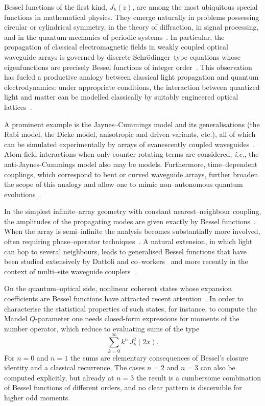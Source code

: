 \documentclass[10pt]{NSP1}
\begin{document}
Bessel functions of the first kind, $J_k(z)$, are among the most ubiquitous special functions 
in mathematical physics.  They emerge naturally in problems possessing circular or cylindrical 
symmetry, in the theory of diffraction, in signal processing, and in the quantum mechanics of 
periodic systems~\cite{Watson,Gradshteyn,NIST,Axioms}.  In particular, the propagation of classical 
electromagnetic fields in weakly coupled optical waveguide arrays is governed by discrete 
Schr\"{o}dinger--type equations whose eigenfunctions are precisely Bessel functions of 
integer order~\cite{Jones,Makris}.  This observation has fueled a productive analogy between 
classical light propagation and quantum electrodynamics: under appropriate conditions, the 
interaction between quantized light and matter can be modelled classically by suitably 
engineered optical lattices~\cite{LonghiI,LonghiII,CrispI,CrispII,ScriptaT}.

A prominent example is the Jaynes--Cummings model \cite{Several,Book} and its generalisations 
(the Rabi model, the Dicke model, anisotropic and driven variants, etc.), all of which can be 
simulated experimentally by arrays of evanescently coupled waveguides~\cite{Jaynes,Shore,Larson,Chen,BraakI,Anisotropic,Bocanegra,Vidiella,Dicke,BraakII}. Atom-field interactions when only counter rotating terms are considered, {\it  i.e.}, the anti-Jaynes-Cummings model \cite{Lara,Mayero} also may be models. Furthermore, time--dependent couplings, which correspond to bent or curved waveguide arrays, further 
broaden the scope of this analogy and allow one to mimic non--autonomous quantum 
evolutions~\cite{Messina,Tsuitsui}.

In the simplest infinite--array geometry with constant nearest--neighbour coupling, the 
amplitudes of the propagating modes are given exactly by Bessel functions~\cite{Jones,Makris}.  
When the array is semi--infinite the analysis becomes substantially more involved, often 
requiring phase--operator techniques~\cite{London,Susskind}.  A natural extension, in which 
light can hop to several neighbours, leads to generalised Bessel functions that have been 
studied extensively by Dattoli and co--workers~\cite{Dattolia,Dattolib,Dattolic} and more 
recently in the context of multi--site waveguide couplers~\cite{Tapia}.

On the quantum--optical side, nonlinear coherent states whose expansion coefficients are 
Bessel functions have attracted recent attention~\cite{Manko,RevMexFis,Gazeau}.  In order to 
characterise the statistical properties of such states, for instance, to compute the Mandel 
$Q$-parameter \cite{Mandel} one needs closed-form expressions for moments of the number operator, 
which reduce to evaluating sums of the type
\begin{equation}\label{eq:firsteq}
\sum_{k=0}^{\infty}k^{n}\,J_k^2(2x).
\end{equation}
For $n=0$ and $n=1$ the sums are elementary consequences of Bessel's closure identity and 
a classical recurrence.  The cases $n=2$ and $n=3$ can also be computed explicitly, but 
already at $n=3$ the result is a cumbersome combination of Bessel functions of different 
orders, and no clear pattern is discernible for higher odd moments.  
\end{document}
